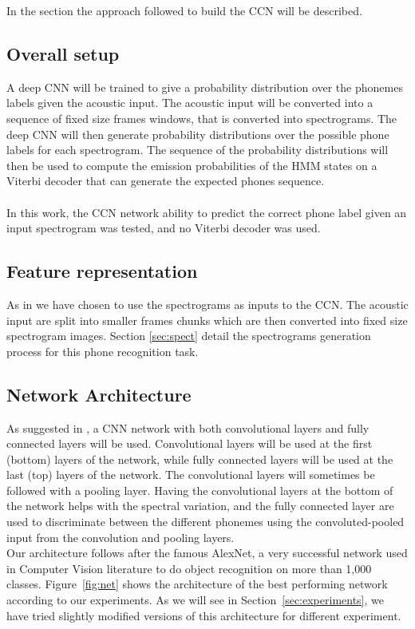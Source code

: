 In the section the approach followed to build the CCN will be described.
\subsection{Overall setup}
A deep CNN will be trained to give a probability distribution over the phonemes labels given the acoustic input. The acoustic input will be converted into a sequence of fixed size frames windows, that is converted into spectrograms. The deep CNN will then generate probability distributions over the possible phone labels for each spectrogram. The sequence of the probability distributions will then be used to compute the emission probabilities of the HMM states on a Viterbi decoder that can generate the expected phones sequence.\\\\
In this work, the CCN network ability to predict the correct phone label given an input spectrogram was tested, and no Viterbi decoder was used.
\subsection{Feature representation}
As in \cite{graves2014towards} we have chosen to use the spectrograms as inputs to the CCN. The acoustic input are split into smaller frames chunks which are then converted into fixed size spectrogram images. Section \ref{sec:spect} detail the spectrograms generation process for this phone recognition task.

\subsection{Network Architecture}
As suggested in \cite{sainath2013deep}, a CNN network with both convolutional layers and fully connected layers will be used. Convolutional layers will be used at the first (bottom) layers of the network, while fully connected layers will be used at the last (top) layers of the network. The convolutional layers will sometimes be followed with a pooling layer. Having the convolutional layers at the bottom of the network helps with the spectral variation, and the fully connected layer are used to discriminate between the different phonemes using the convoluted-pooled input from the convolution and pooling layers.
\\
Our architecture follows after the famous AlexNet\cite{NIPS2012_4824}, a very successful network used in Computer Vision literature to do object recognition on more than 1,000 classes. Figure~\ref{fig:net} shows the architecture of the best performing network according to our experiments. As we will see in Section~\ref{sec:experiments}, we have tried slightly modified versions of this architecture for different experiment.

